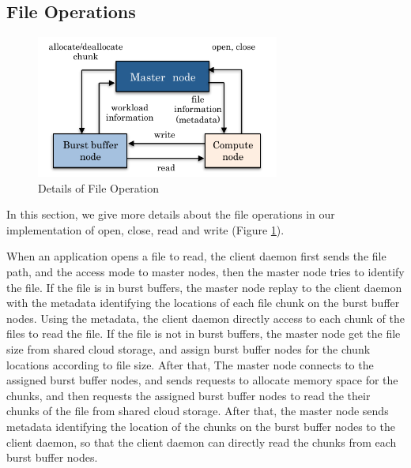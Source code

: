 
\subsection{File Operations}

\begin{figure}
\centering
\includegraphics[width=8cm]{img/file_operation-2}
\caption{Details of File Operation}
\label{implementation:file operation}
\end{figure}

In this section, we give more details about the file operations in our
implementation of open, close, read and write (Figure
\ref{implementation:file operation}).

When an application opens a file to read, the client daemon first sends the file
path, and the access mode to master nodes, then the master node tries to
identify the file. If the file is in burst buffers, the master node replay to the client
daemon with the metadata identifying the locations of each file
chunk on the burst buffer nodes.
Using the metadata, the client daemon directly access to each chunk of
the files to read the file.
If the file is not in burst buffers, the master node get the file size from
shared cloud storage, and assign burst buffer nodes for the chunk
locations according to file size. After that,
The master node connects to the assigned burst buffer nodes, and sends
requests to allocate memory space for the chunks, and then requests the assigned
burst buffer nodes to read the their chunks of the file from shared cloud storage. After
that, the master node sends metadata identifying the location of the
chunks on the burst buffer nodes to the client daemon, so that the client daemon
can directly read the chunks from each burst buffer nodes.


